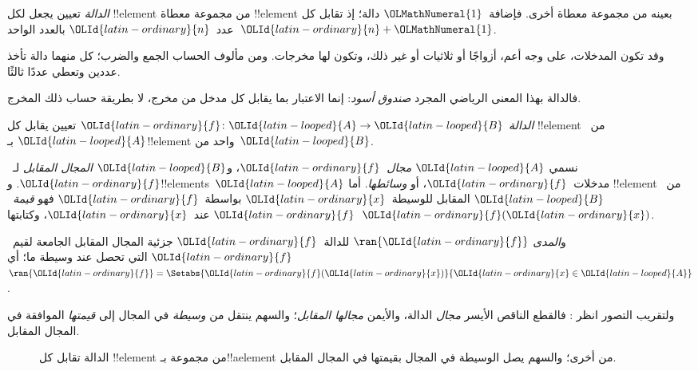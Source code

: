 \documentclass[../../../include/open-logic-section]{subfiles}
\begin{document}

\begin{explain}
\emph{الدالة} تعيين يجعل لكل !!{element} من مجموعة معطاة
!!{element} بعينه من مجموعة معطاة أخرى. فإضافة~$\OLMathNumeral{1}$ دالة؛ إذ
تقابل كل عدد~$\OLId{latin-ordinary}{n}$ بالعدد الواحد~$\OLId{latin-ordinary}{n}+\OLMathNumeral{1}$.

وقد تكون المدخلات، على وجه أعم، أزواجًا أو ثلاثيات أو غير ذلك،
وتكون لها مخرجات. ومن مألوف الحساب الجمع والضرب؛ كل منهما دالة
تأخذ عددين وتعطي عددًا ثالثًا.

فالدالة بهذا المعنى الرياضي المجرد \emph{صندوق أسود}:
إنما الاعتبار بما يقابل كل مدخل من مخرج، لا بطريقة حساب ذلك المخرج.
\end{explain}

\begin{defn}[الدالة]
\emph{الدالة} $\OLId{latin-ordinary}{f} \colon \OLId{latin-looped}{A} \to \OLId{latin-looped}{B}$ تعيين يقابل كل !!{element}
من~$\OLId{latin-looped}{A}$ بـ!!{element} واحد من~$\OLId{latin-looped}{B}$.

نسمي $\OLId{latin-looped}{A}$ \emph{مجال}~$\OLId{latin-ordinary}{f}$، و$\OLId{latin-looped}{B}$ \emph{المجال المقابل} لـ~$\OLId{latin-ordinary}{f}$.
و!!{element}s~$\OLId{latin-looped}{A}$ مدخلات~$\OLId{latin-ordinary}{f}$، أو \emph{وسائطها}. أما !!{element}
من~$\OLId{latin-looped}{B}$ المقابل للوسيطة~$\OLId{latin-ordinary}{x}$ بواسطة~$\OLId{latin-ordinary}{f}$ فهو \emph{قيمة~$\OLId{latin-ordinary}{f}$} عند~$\OLId{latin-ordinary}{x}$،
وكتابتها~$\OLId{latin-ordinary}{f}(\OLId{latin-ordinary}{x})$.

و\emph{المدى} $\ran{\OLId{latin-ordinary}{f}}$ للدالة~$\OLId{latin-ordinary}{f}$ جزئية المجال المقابل
الجامعة لقيم~$\OLId{latin-ordinary}{f}$ التي تحصل عند وسيطة ما؛ أي $\ran{\OLId{latin-ordinary}{f}} =
\Setabs{\OLId{latin-ordinary}{f}(\OLId{latin-ordinary}{x})}{\OLId{latin-ordinary}{x} \in \OLId{latin-looped}{A}}$.
\end{defn}

ولتقريب التصور انظر : فالقطع الناقص الأيسر
\emph{مجال} الدالة، والأيمن \emph{مجالها المقابل}؛ والسهم ينتقل من
\emph{وسيطة} في المجال إلى \emph{قيمتها} الموافقة في المجال المقابل.

\begin{figure}
  \caption{الدالة تقابل كل !!{element} من مجموعة بـ!!a{element} من أخرى؛
    والسهم يصل الوسيطة في المجال بقيمتها في المجال المقابل.}
\end{figure}
\end{document}
